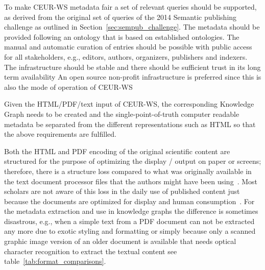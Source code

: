 \documentclass[runningheads]{llncs}
\newcommand{\footnotelink}[2]{\href{#1}{#2}\footnote{#1}}
\begin{document}
To make CEUR-WS metadata fair a set of relevant queries should be supported, as derived from the original set of queries of the 2014 Semantic publishing challenge as outlined in Section~\ref{sec:sempub_challenge}.
The metadata should be provided following an ontology that is based on established ontologies.
The manual and automatic curation of entries should be possible with public access for all stakeholders, e.g., editors, authors, organizers, publishers and indexers.
The infrastructure should be stable and there should be sufficient trust in its long term availability
An open source non-profit infrastructure is preferred since this is also the mode of operation of CEUR-WS

Given the HTML/PDF/text input of CEUR-WS, the corresponding Knowledge Graph needs to be created and the single-point-of-truth computer readable metadata be separated from the different representations such as HTML so that the above requirements are fulfilled.




Both the HTML and PDF encoding of the original scientific content are structured for the purpose of optimizing the display / output on paper or screens; therefore, there is a structure loss compared to what was originally available in the text document processor files that the authors might have been using~\cite{Fahl2023HSP}.  Most scholars are not aware of this loss in the daily use of published content just because the documents are optimized for display and human consumption~\cite{Yu2020}. For the metadata extraction and use in knowledge graphs the difference is sometimes disastrous, e.g., when a simple text from a PDF document can not be extracted any more due to exotic styling and formatting or simply because only a scanned graphic image version of an older document is available that needs optical character recognition to extract the textual content see table~\ref{tab:format_comparisons}.
\end{document}
